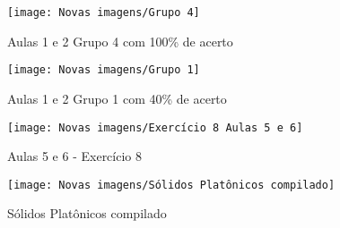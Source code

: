 

\begin{figure}[htbp] \centering
  \caption{Aulas 1 e 2 Grupo 4 com 100\% de acerto}
  \label{fig: Aulas 1 e 2 - 100}
  \texttt{[image: Novas imagens/Grupo 4]}
  \legend{\autoria}
\end{figure}

\begin{figure}[htbp] \centering
  \caption{Aulas 1 e 2 Grupo 1 com 40\% de acerto}
  \label{fig: Aulas 1 e 2 - 40}
  \texttt{[image: Novas imagens/Grupo 1]}
  \legend{\autoria}
\end{figure}

\begin{figure}[htbp] \centering
  \caption{Aulas 5 e 6 - Exercício 8}
  \label{fig:Aulas 5 e 6 - Exercício 8}
  \texttt{[image: Novas imagens/Exercício 8 Aulas 5 e 6]}
  \legend{\autoria}
\end{figure}

\begin{figure}[htbp] \centering
  \caption{Sólidos Platônicos compilado}
  \label{fig: Sólidos Platônicos compilado}
  \texttt{[image: Novas imagens/Sólidos Platônicos compilado]}
  \legend{\autoria}
\end{figure}
